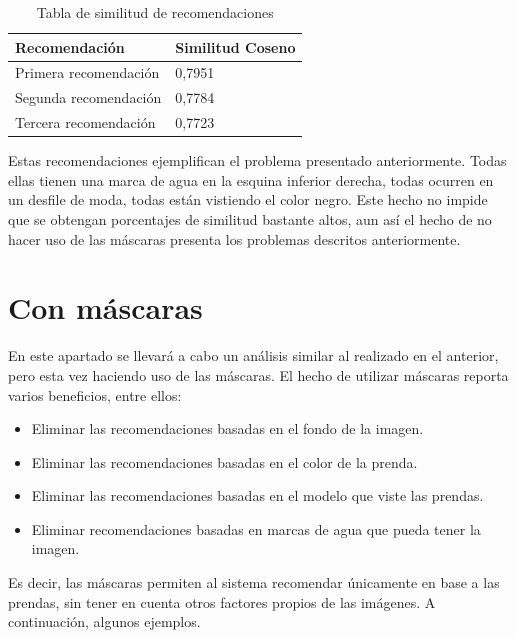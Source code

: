 \documentclass[12pt]{report} %
\begin{document}
	\begin{table}[H]
		\centering
		\caption{Tabla de similitud de recomendaciones}
		\begin{tabular}{ll}
				\textbf{Recomendación} & \textbf{Similitud Coseno} \\
				\midrule
				Primera recomendación & 0,7951 \\
				Segunda recomendación & 0,7784 \\
				Tercera recomendación & 0,7723 \\
				\bottomrule
		\end{tabular}
	\end{table}
	Estas recomendaciones ejemplifican el problema presentado anteriormente. Todas ellas tienen una marca de agua en la
	esquina inferior derecha, todas ocurren en un desfile de moda, todas están vistiendo el color negro. Este hecho no impide
	que se obtengan porcentajes de similitud bastante altos, aun así el hecho de no hacer
	uso de las máscaras presenta los problemas descritos anteriormente.

	\section{Con máscaras}

	En este apartado se llevará a cabo un análisis similar al realizado en el anterior, pero esta vez haciendo uso de las máscaras.
	El hecho de utilizar máscaras reporta varios beneficios, entre ellos:
	\begin{itemize}
		\item Eliminar las recomendaciones basadas en el fondo de la imagen.
		\item Eliminar las recomendaciones basadas en el color de la prenda.
		\item Eliminar las recomendaciones basadas en el modelo que viste las prendas.
		\item Eliminar recomendaciones basadas en marcas de agua que pueda tener la imagen.
	\end{itemize}
	Es decir, las máscaras permiten al sistema recomendar únicamente en base a las prendas, sin tener en cuenta otros factores propios de las imágenes.
	A continuación, algunos ejemplos.
\end{document}
